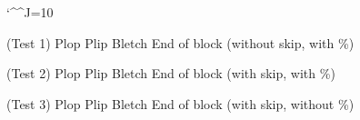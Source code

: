 \documentclass{article}
\begin{document}
\catcode`\^^J=10
\def\pu{\directlua{pu()}}


\pu

(Test 1)
%
Plop
 Plip
  Bletch
End of block
(without skip, with \%)

(Test 2)
%
Plop
 Plip
  Bletch
End of block
(with skip, with \%)

(Test 3)
Plop
 Plip
  Bletch
End of block
(with skip, without \%)
\end{document}
